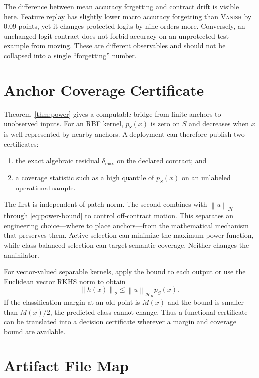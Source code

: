 \documentclass{vanish_ieee}
\theoremstyle{definition}
\newcommand{\Hcal}{\mathcal{H}}
\newcommand{\norm}[1]{\left\lVert#1\right\rVert}
\newcommand{\VANISH}{\textsc{Vanish}}
\begin{document}
The difference between mean accuracy forgetting and contract drift is visible here.  Feature replay has slightly lower macro accuracy forgetting than \VANISH{} by 0.09 points, yet it changes protected logits by nine orders more.  Conversely, an unchanged logit contract does not forbid accuracy on an unprotected test example from moving.  These are different observables and should not be collapsed into a single ``forgetting'' number.

\section{Anchor Coverage Certificate}

Theorem~\ref{thm:power} gives a computable bridge from finite anchors to unobserved inputs.  For an RBF kernel, $p_S(x)$ is zero on $S$ and decreases when $x$ is well represented by nearby anchors.  A deployment can therefore publish two certificates:
\begin{enumerate}
  \item the exact algebraic residual $\delta_{\max}$ on the declared contract; and
  \item a coverage statistic such as a high quantile of $p_S(x)$ on an unlabeled operational sample.
\end{enumerate}
The first is independent of patch norm.  The second combines with $\norm{u}_{\Hcal}$ through \eqref{eq:power-bound} to control off-contract motion.  This separates an engineering choice---where to place anchors---from the mathematical mechanism that preserves them.  Active selection can minimize the maximum power function, while class-balanced selection can target semantic coverage.  Neither changes the annihilator.

For vector-valued separable kernels, apply the bound to each output or use the Euclidean vector RKHS norm to obtain
\begin{equation}
\norm{h(x)}_2\leq\norm{u}_{\Hcal_K}p_S(x).
\end{equation}
If the classification margin at an old point is $M(x)$ and the bound is smaller than $M(x)/2$, the predicted class cannot change.  Thus a functional certificate can be translated into a decision certificate wherever a margin and coverage bound are available.

\section{Artifact File Map}
\end{document}

